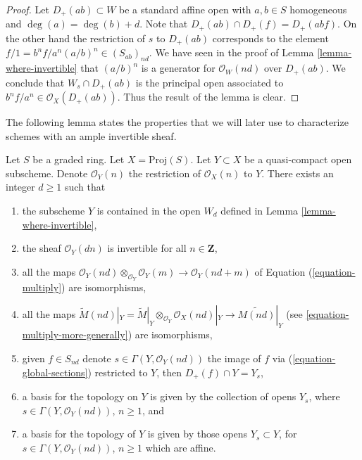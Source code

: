 \begin{proof}
Let $D_{+}(ab) \subset W$ be a standard affine open with
$a, b \in S$ homogeneous and $\deg(a) = \deg(b) + d$.
Note that $D_{+}(ab) \cap D_{+}(f) = D_{+}(abf)$.
On the other hand the restriction of $s$ to $D_{+}(ab)$
corresponds to the element $f/1 = b^nf/a^n (a/b)^n \in (S_{ab})_{nd}$.
We have seen in the proof of Lemma \ref{lemma-where-invertible} that
$(a/b)^n$ is a generator for $\mathcal{O}_W(nd)$ over $D_{+}(ab)$.
We conclude that $W_s \cap D_{+}(ab)$ is the principal open
associated to $b^nf/a^n \in \mathcal{O}_X(D_{+}(ab))$.
Thus the result of the lemma is clear.
\end{proof}

\noindent
The following lemma states the properties that we will later use to
characterize schemes with an ample invertible sheaf.

\begin{lemma}
\label{lemma-ample-on-proj}
Let $S$ be a graded ring.
Let $X = \text{Proj}(S)$.
Let $Y \subset X$ be a quasi-compact open subscheme.
Denote $\mathcal{O}_Y(n)$ the restriction of
$\mathcal{O}_X(n)$ to $Y$.
There exists an integer $d \geq 1$ such that
\begin{enumerate}
\item the subscheme $Y$ is contained in the open $W_d$ defined
in Lemma \ref{lemma-where-invertible},
\item the sheaf $\mathcal{O}_Y(dn)$ is invertible for all $n \in \mathbf{Z}$,
\item all the maps
$\mathcal{O}_Y(nd) \otimes_{\mathcal{O}_Y} \mathcal{O}_Y(m)
\longrightarrow
\mathcal{O}_Y(nd + m)$
of Equation (\ref{equation-multiply}) are isomorphisms,
\item all the maps
$\widetilde M(nd)|_Y = \widetilde M|_Y \otimes_{\mathcal{O}_Y}
\mathcal{O}_X(nd)|_Y \to \widetilde{M(nd)}|_Y$
(see \ref{equation-multiply-more-generally}) are isomorphisms,
\item given $f \in S_{nd}$ denote $s \in \Gamma(Y, \mathcal{O}_Y(nd))$
the image of $f$ via (\ref{equation-global-sections})
restricted to $Y$, then $D_{+}(f) \cap Y = Y_s$,
\item a basis for the topology on $Y$ is given
by the collection of opens $Y_s$, where $s \in \Gamma(Y, \mathcal{O}_Y(nd))$,
$n \geq 1$, and
\item a basis for the topology of $Y$ is given
by those opens $Y_s \subset Y$, for
$s \in \Gamma(Y, \mathcal{O}_Y(nd))$, $n \geq 1$ which are affine.
\end{enumerate}
\end{lemma}

